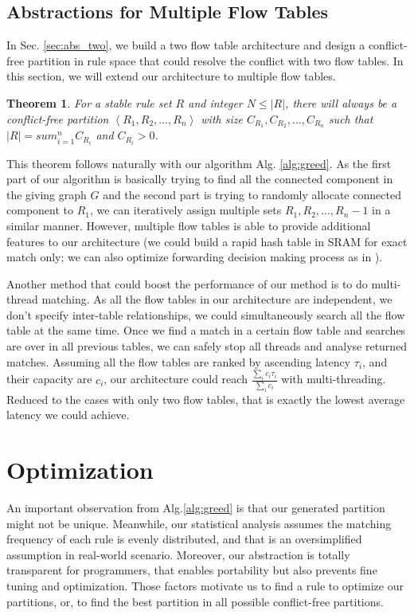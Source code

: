 \documentclass[10pt,twocolumn,letterpaper]{article}
\newtheorem{theorem}{Theorem}
\begin{document}
\subsection{Abstractions for Multiple Flow Tables}
In Sec. \ref{sec:abs_two}, we build a two flow table architecture and design a conflict-free partition in rule space that could resolve the conflict with two flow tables. In this section, we will extend our architecture to multiple flow tables.

\begin{theorem}
For a stable rule set $R$ and integer $N\leq |R|$, there will always be a conflict-free partition $\left<R_1,R_2,\ldots,R_n\right>$ with size $C_{R_1},C_{R_2},\ldots,C_{R_n}$ such that $|R|=sum_{i=1}^n C_{R_i}$ and $C_{R_i}>0$.
\end{theorem}

This theorem follows naturally with our algorithm Alg. \ref{alg:greed}. As the first part of our algorithm is basically trying to find all the connected component in the giving graph $G$ and the second part is trying to randomly allocate connected component to $R_1$, we can iteratively assign multiple sets $R_1,R_2,\ldots,R_n-1$ in a similar manner. However, multiple flow tables is able to provide additional features to our architecture (\eg we could build a rapid hash table in SRAM for exact match only; we can also optimize forwarding decision making process as in \cite{shelly2014flow}). 

Another method that could boost the performance of our method is to do multi-thread matching. As all the flow tables in our architecture are independent, \ie we don't specify inter-table relationships, we could simultaneously search all the flow table at the same time. Once we find a match in a certain flow table and searches are over in all previous tables, we can safely stop all threads and analyse returned matches. Assuming all the flow tables are ranked by ascending latency $\tau_i$, and their capacity are $c_i$, our architecture could reach $\frac{\sum_i c_i\tau_i}{\sum_i c_i}$ with multi-threading. Reduced to the cases with only two flow tables, that is exactly the lowest average latency we could achieve.

\section{Optimization} \label{sec:opt}
An important observation from Alg.\ref{alg:greed} is that our generated partition might not be unique. Meanwhile, our statistical analysis assumes the matching frequency of each rule is evenly distributed, and that is an oversimplified assumption in real-world scenario. Moreover, our abstraction is totally transparent for programmers, that enables portability but also  prevents fine tuning and optimization. Those factors motivate us to find a rule to optimize our partitions, or, to find the best partition in all possible conflict-free partitions.
\end{document}
